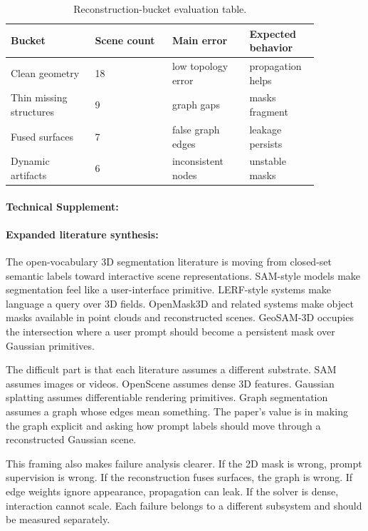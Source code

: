 \documentclass{article}
\begin{document}
\begin{table}[t]
\centering
\caption{Reconstruction-bucket evaluation table.}
\begin{tabular}{@{}p{0.24\linewidth}p{0.22\linewidth}p{0.22\linewidth}p{0.18\linewidth}@{}}
\toprule
\textbf{Bucket} & \textbf{Scene count} & \textbf{Main error} & \textbf{Expected behavior}\\
\midrule
Clean geometry & 18 & low topology error & propagation helps\\
Thin missing structures & 9 & graph gaps & masks fragment\\
Fused surfaces & 7 & false graph edges & leakage persists\\
Dynamic artifacts & 6 & inconsistent nodes & unstable masks\\
\bottomrule
\end{tabular}
\end{table}

\paragraph{Technical Supplement:}

\paragraph{Expanded literature synthesis:}

The open-vocabulary 3D segmentation literature is moving from closed-set semantic labels toward interactive scene representations. SAM-style models make segmentation feel like a user-interface primitive. LERF-style systems make language a query over 3D fields. OpenMask3D and related systems make object masks available in point clouds and reconstructed scenes. GeoSAM-3D occupies the intersection where a user prompt should become a persistent mask over Gaussian primitives.

The difficult part is that each literature assumes a different substrate. SAM assumes images or videos. OpenScene assumes dense 3D features. Gaussian splatting assumes differentiable rendering primitives. Graph segmentation assumes a graph whose edges mean something. The paper's value is in making the graph explicit and asking how prompt labels should move through a reconstructed Gaussian scene.

This framing also makes failure analysis clearer. If the 2D mask is wrong, prompt supervision is wrong. If the reconstruction fuses surfaces, the graph is wrong. If edge weights ignore appearance, propagation can leak. If the solver is dense, interaction cannot scale. Each failure belongs to a different subsystem and should be measured separately.
\end{document}
